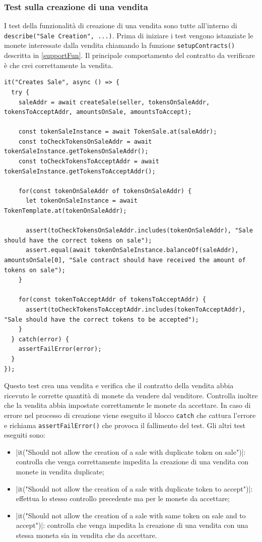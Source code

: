 \documentclass[a4paper]{article}
\begin{document}
        \subsubsection{Test sulla creazione di una vendita}
        I test della funzionalità di creazione di una vendita sono tutte all'interno di \verb|describe("Sale Creation", ...)|. Prima di iniziare i test vengono istanziate le monete interessate dalla vendita chiamando la funzione \verb|setupContracts()| descritta in \ref{supportFun}.
        Il principale comportamento del contratto da verificare è che crei correttamente la vendita.
\begin{lstlisting}[style=ES6, title={Il contratto crea correttamente una vendita}]
it("Creates Sale", async () => {
  try {
    saleAddr = await createSale(seller, tokensOnSaleAddr, tokensToAcceptAddr, amountsOnSale, amountsToAccept);

    const tokenSaleInstance = await TokenSale.at(saleAddr);
    const toCheckTokensOnSaleAddr = await tokenSaleInstance.getTokensOnSaleAddr();
    const toCheckTokensToAcceptAddr = await tokenSaleInstance.getTokensToAcceptAddr();

    for(const tokenOnSaleAddr of tokensOnSaleAddr) {
      let tokenOnSaleInstance = await TokenTemplate.at(tokenOnSaleAddr);

      assert(toCheckTokensOnSaleAddr.includes(tokenOnSaleAddr), "Sale should have the correct tokens on sale");
      assert.equal(await tokenOnSaleInstance.balanceOf(saleAddr), amountsOnSale[0], "Sale contract should have received the amount of tokens on sale");
    }

    for(const tokenToAcceptAddr of tokensToAcceptAddr) {
      assert(toCheckTokensToAcceptAddr.includes(tokenToAcceptAddr), "Sale should have the correct tokens to be accepted");
    }
  } catch(error) {
    assertFailError(error);
  }
});\end{lstlisting}
        Questo test crea una vendita e verifica che il contratto della vendita abbia ricevuto le corrette quantità di monete da vendere dal venditore. Controlla inoltre che la vendita abbia impostate correttamente le monete da accettare.
        In caso di errore nel processo di creazione viene eseguito il blocco \verb|catch| che cattura l'errore e richiama \verb|assertFailError()| che provoca il fallimento del test.
        Gli altri test eseguiti sono:
        \begin{itemize}
          \item \spverb|it("Should not allow the creation of a sale with duplicate   token on sale")|: controlla che venga correttamente impedita la creazione di una vendita con monete in vendita duplicate;
          \item \spverb|it("Should not allow the creation of a sale with duplicate   token to accept")|: effettua lo stesso controllo precedente ma per le monete da accettare;
          \item \spverb|it("Should not allow the creation of a sale with same token  on sale and to accept")|: controlla che venga impedita la creazione di una vendita con una stessa moneta sia in vendita che da accettare.
        \end{itemize}
\end{document}
